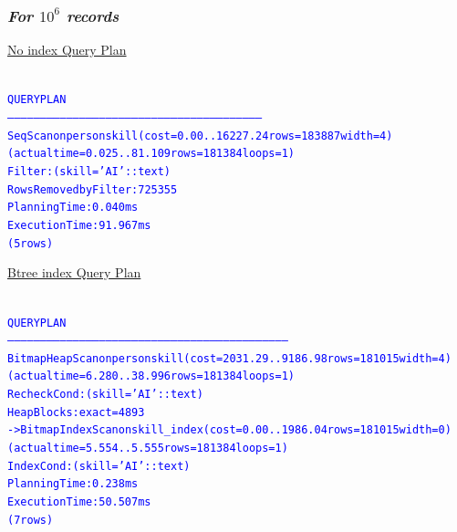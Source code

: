 \documentclass{article}
\begin{document}
    \subsubsection*{\emph{For $10^6$ records}}
    \underline{No index Query Plan}
    \begin{center}
      {\tiny
      \begin{alltt}
      \textcolor{blue}{
        QUERY PLAN                                                     
        --------------------------------------------------------------------------------------------------------------------
         Seq Scan on personskill  (cost=0.00..16227.24 rows=183887 width=4) (actual time=0.025..81.109 rows=181384 loops=1)
           Filter: (skill = 'AI'::text)
           Rows Removed by Filter: 725355
         Planning Time: 0.040 ms
         Execution Time: 91.967 ms
        (5 rows)
       }
      \end{alltt}
      }
    \end{center}
    \underline{Btree index Query Plan}
    \begin{center}
      {\tiny
      \begin{alltt}
      \textcolor{blue}{
        QUERY PLAN                                                            
        ---------------------------------------------------------------------------------------------------------------------------------
         Bitmap Heap Scan on personskill  (cost=2031.29..9186.98 rows=181015 width=4) (actual time=6.280..38.996 rows=181384 loops=1)
           Recheck Cond: (skill = 'AI'::text)
           Heap Blocks: exact=4893
           ->  Bitmap Index Scan on skill_index  (cost=0.00..1986.04 rows=181015 width=0) (actual time=5.554..5.555 rows=181384 loops=1)
                 Index Cond: (skill = 'AI'::text)
         Planning Time: 0.238 ms
         Execution Time: 50.507 ms
        (7 rows)
       }
      \end{alltt}
      }
    \end{center}
\end{document}

